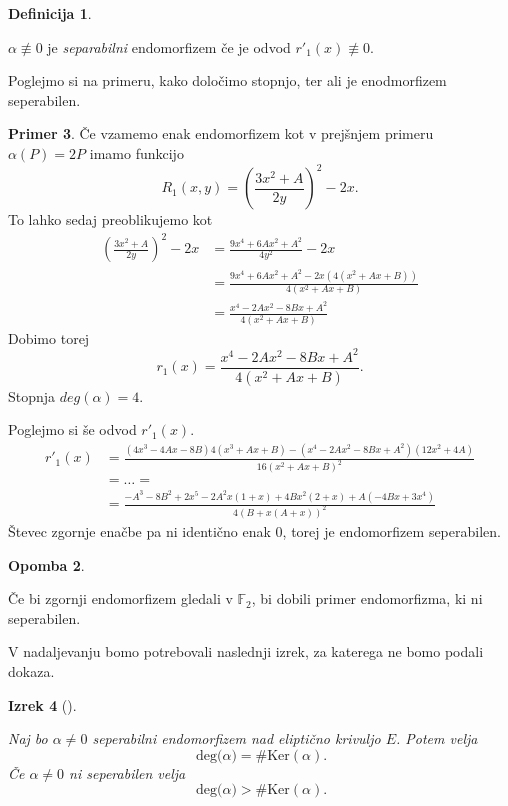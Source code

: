 \documentclass[12pt,a4paper,twoside]{article}
\theoremstyle{definition} %
\newtheorem{definicija}{Definicija}[section]
\newtheorem{primer}[definicija]{Primer}
\newtheorem{opomba}[definicija]{Opomba}
\theoremstyle{plain} %
\newtheorem{izrek}[definicija]{Izrek}
\numberwithin{equation}{section}  %
\newcommand{\F}{\mathbb F}
\newcommand{\DEG}[1]{\ \text{deg(}{#1}\text{)}}
\begin{document}
\begin{definicija}~

$\alpha \not \equiv 0$ je \emph{separabilni} endomorfizem če je odvod $r'_1(x) \not \equiv 0$.
\end{definicija}

Poglejmo si na primeru, kako določimo stopnjo, ter ali je enodmorfizem seperabilen.

\begin{primer}
Če vzamemo enak endomorfizem kot v prejšnjem primeru $\alpha(P) = 2P$ imamo funkcijo
$$R_1(x,y) = \left(\frac{3x^2+A}{2y}\right)^2-2x.$$
To lahko sedaj preoblikujemo kot
\begin{align}
\left(\frac{3x^2+A}{2y}\right)^2-2x &{}= \frac{9x^4+6Ax^2+A^2}{4y^2}-2x \nonumber \\
&{} = \frac{9x^4+6Ax^2+A^2 - 2x(4(x^2+Ax+B))}{4(x^2+Ax+B)} \nonumber \\
&{} = \frac{x^4-2Ax^2-8Bx+A^2}{4(x^2+Ax+B)} \nonumber
\end{align}
Dobimo torej
$$r_1(x) = \frac{x^4-2Ax^2-8Bx+A^2}{4(x^2+Ax+B)}.$$
Stopnja $deg(\alpha) = 4$.

Poglejmo si še odvod $r'_1(x)$.
\begin{align}
r'_1(x) &{}=\frac{(4x^3-4Ax-8B)4(x^3+Ax+B)-(x^4-2Ax^2-8Bx+A^2)(12x^2+4A)}{16(x^2+Ax+B)^2} \nonumber \\
&{}= \ldots = \nonumber \\
&{} = \frac{-A^3 - 8 B^2 + 2 x^5 - 2 A^2 x (1 + x) + 4 B x^2 (2 + x) +  A (-4 B x + 3 x^4)}{4 (B + x (A + x))^2} \nonumber
\end{align}
Števec zgornje enačbe pa ni identično enak $0$, torej je endomorfizem seperabilen.
\begin{opomba}~

Če bi zgornji endomorfizem gledali v $\F_2$, bi dobili primer endomorfizma, ki ni seperabilen.
\end{opomba}
\end{primer}

V nadaljevanju bomo potrebovali naslednji izrek, za katerega ne bomo podali dokaza.

\begin{izrek}[]~

\label{izrek:2.21}
Naj bo $\alpha \neq 0$ seperabilni endomorfizem nad eliptično krivuljo $E$. Potem velja
$$\DEG{\alpha}= \# \text{Ker}(\alpha).$$
Če $\alpha \neq 0$ ni seperabilen velja
$$\DEG{\alpha} > \# \text{Ker}(\alpha).$$
\end{izrek}
\end{document}
